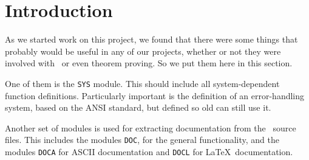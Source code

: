 \section{Introduction}

As we started work on this project, we found that there were some things
that probably would be useful in any of our projects, whether or not they were
involved with \keim\ or even theorem proving.  So we put them here in 
this section. 

One of them is the {\tt SYS} module.  This should include all 
system-dependent function definitions.  Particularly important is the
definition of an error-handling system, based on the ANSI standard,
but defined  so old  can still use it. 

Another set of modules is used for extracting documentation from the 
\lisp\ source files.  This includes the modules {\tt DOC}, for the
general functionality, and the modules {\tt DOCA} for ASCII documentation
and {\tt DOCL} for \LaTeX\ documentation. 

